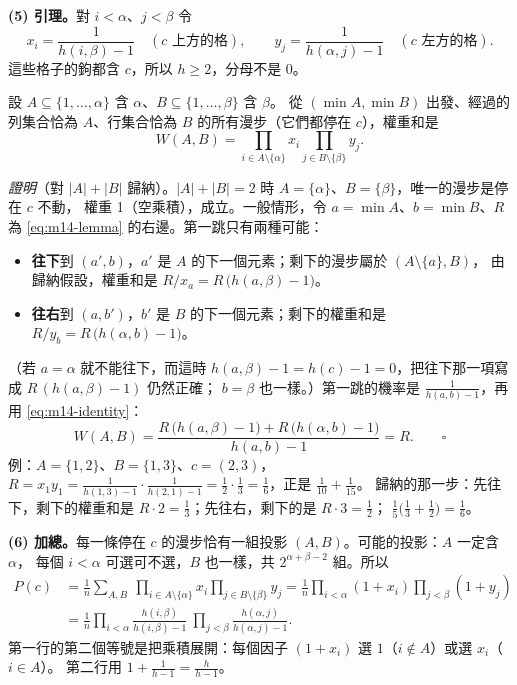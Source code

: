 \textbf{(5) 引理。}對 $i<\alpha$、$j<\beta$ 令
\[
x_i=\frac{1}{h(i,\beta)-1}\quad(c\text{ 上方的格}),\qquad
y_j=\frac{1}{h(\alpha,j)-1}\quad(c\text{ 左方的格}).
\]
這些格子的鉤都含 $c$，所以 $h\ge2$，分母不是 0。

\begin{thmbox}[引理]
設 $A\subseteq\{1,\ldots,\alpha\}$ 含 $\alpha$、$B\subseteq\{1,\ldots,\beta\}$ 含 $\beta$。
從 $(\min A,\min B)$ 出發、經過的列集合恰為 $A$、行集合恰為 $B$ 的所有漫步（它們都停在 $c$），權重和是
\begin{equation}\label{eq:m14-lemma}
W(A,B)=\prod_{i\in A\setminus\{\alpha\}}x_i\prod_{j\in B\setminus\{\beta\}}y_j .
\end{equation}
\end{thmbox}

\textit{證明}（對 $|A|+|B|$ 歸納）。$|A|+|B|=2$ 時 $A=\{\alpha\}$、$B=\{\beta\}$，唯一的漫步是停在 $c$ 不動，
權重 1（空乘積），成立。一般情形，令 $a=\min A$、$b=\min B$、$R$ 為 \eqref{eq:m14-lemma} 的右邊。第一跳只有兩種可能：
\begin{itemize}
  \item \textbf{往下}到 $(a',b)$，$a'$ 是 $A$ 的下一個元素；剩下的漫步屬於 $(A\setminus\{a\},B)$，
        由歸納假設，權重和是 $R/x_a=R\,\bigl(h(a,\beta)-1\bigr)$。
  \item \textbf{往右}到 $(a,b')$，$b'$ 是 $B$ 的下一個元素；剩下的權重和是 $R/y_b=R\,\bigl(h(\alpha,b)-1\bigr)$。
\end{itemize}
（若 $a=\alpha$ 就不能往下，而這時 $h(a,\beta)-1=h(c)-1=0$，把往下那一項寫成 $R\,(h(a,\beta)-1)$ 仍然正確；
$b=\beta$ 也一樣。）第一跳的機率是 $\frac{1}{h(a,b)-1}$，再用 \eqref{eq:m14-identity}：
\[
W(A,B)=\frac{R\,\bigl(h(a,\beta)-1\bigr)+R\,\bigl(h(\alpha,b)-1\bigr)}{h(a,b)-1}=R .\qquad\square
\]
例：$A=\{1,2\}$、$B=\{1,3\}$、$c=(2,3)$，
$R=x_1y_1=\frac{1}{h(1,3)-1}\cdot\frac{1}{h(2,1)-1}=\frac12\cdot\frac13=\frac16$，正是 $\frac1{10}+\frac1{15}$。
歸納的那一步：先往下，剩下的權重和是 $R\cdot2=\frac13$；先往右，剩下的是 $R\cdot3=\frac12$；
$\frac15\bigl(\frac13+\frac12\bigr)=\frac16$。

\textbf{(6) 加總。}每一條停在 $c$ 的漫步恰有一組投影 $(A,B)$。可能的投影：$A$ 一定含 $\alpha$，
每個 $i<\alpha$ 可選可不選，$B$ 也一樣，共 $2^{\alpha+\beta-2}$ 組。所以
\begin{equation}\label{eq:m14-sum}
\begin{aligned}
P(c)&=\frac1n\sum_{A,B}\ \prod_{i\in A\setminus\{\alpha\}}x_i\prod_{j\in B\setminus\{\beta\}}y_j
=\frac1n\prod_{i<\alpha}(1+x_i)\prod_{j<\beta}(1+y_j)\\
&=\frac1n\prod_{i<\alpha}\frac{h(i,\beta)}{h(i,\beta)-1}\ \prod_{j<\beta}\frac{h(\alpha,j)}{h(\alpha,j)-1}.
\end{aligned}
\end{equation}
第一行的第二個等號是把乘積展開：每個因子 $(1+x_i)$ 選 $1$（$i\notin A$）或選 $x_i$（$i\in A$）。
第二行用 $1+\frac{1}{h-1}=\frac{h}{h-1}$。

